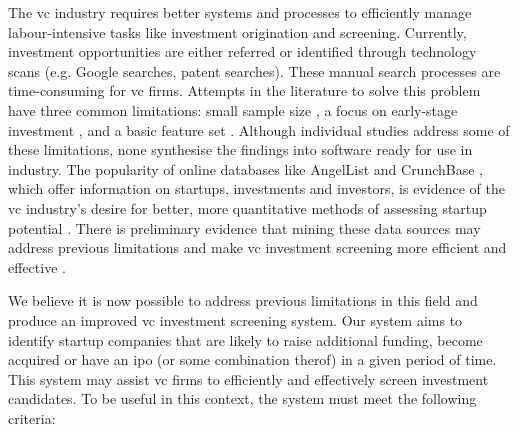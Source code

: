 \documentclass[../thesis/thesis.tex]{subfiles}
\begin{document}
The \gls{vc} industry requires better systems and processes to efficiently manage labour-intensive tasks like investment origination and screening. Currently, investment opportunities are either referred or identified through technology scans (e.g. Google searches, patent searches). These manual search processes are time-consuming for \gls{vc} firms. Attempts in the literature to solve this problem have three common limitations: small sample size \cite{ahlers2015, gimmon2010, dixon2014, hoenen2014, yu2015, an2015, werth2013, croce2016}, a focus on early-stage investment \cite{beckwith2016, ahlers2015, cheng2016, yuan2016, croce2016, stone2014}, and a basic feature set \cite{ahlers2015, an2015, cheng2016, croce2016, werth2013, gimmon2010}. Although individual studies address some of these limitations, none synthesise the findings into software ready for use in industry. The popularity of online databases like AngelList and CrunchBase , which offer information on startups, investments and investors, is evidence of the \gls{vc} industry's desire for better, more quantitative methods of assessing startup potential \cite{patil2015}. There is preliminary evidence that mining these data sources may address previous limitations and make \gls{vc} investment screening more efficient and effective \cite{stone2014,bhat2011}.

We believe it is now possible to address previous limitations in this field and produce an improved \gls{vc} investment screening system. Our system aims to identify startup companies that are likely to raise additional funding, become acquired or have an \gls{ipo} (or some combination therof) in a given period of time. This system may assist \gls{vc} firms to efficiently and effectively screen investment candidates. To be useful in this context, the system must meet the following criteria:
\end{document}
